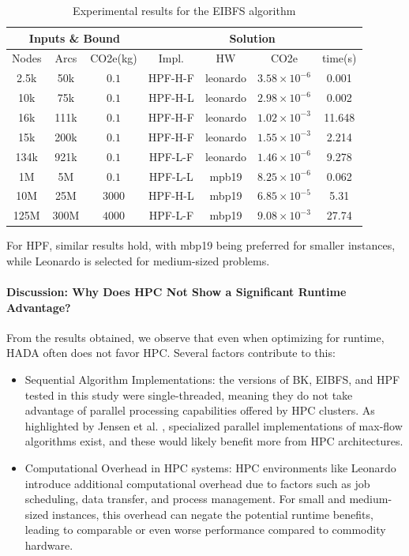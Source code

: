 \documentclass[a4paper,singleside,12pt]{report} %
\begin{document}
\begin{table}[h!]
    \centering
    \begin{tabular}{|ccc|cccc|}
        \hline
        \multicolumn{3}{|c|}{Inputs \& Bound} & \multicolumn{4}{c|}{Solution} \\
        \hline
        Nodes & Arcs & CO2e(kg) & Impl. & HW & CO2e & time(s) \\
        \hline
        2.5k & 50k & $0.1$ & HPF-H-F & leonardo & $3.58 \times 10^{-6}$ & 0.001 \\
        10k & 75k & $0.1$ & HPF-H-L & leonardo & $2.98 \times 10^{-6}$ & 0.002 \\
        16k & 111k & $0.1$ & HPF-H-F & leonardo & $1.02 \times 10^{-3}$ & 11.648 \\
        15k & 200k & $0.1$ & HPF-H-F & leonardo & $1.55 \times 10^{-3}$ & 2.214 \\
        134k & 921k & $0.1$ & HPF-L-F & leonardo & $1.46 \times 10^{-6}$ & 9.278 \\
        1M & 5M & $0.1$ & HPF-L-L & mpb19 & $8.25 \times 10^{-6}$ & 0.062 \\
        10M & 25M & $3000$ & HPF-H-L & mbp19 & $6.85 \times 10^{-5}$ & 5.31 \\
        125M & 300M & $4000$ & HPF-L-F & mbp19 & $9.08 \times 10^{-3}$ & 27.74 \\
        \hline
    \end{tabular}
    \caption{Experimental results for the EIBFS algorithm}
    \label{tab:hpf_results_runtime}
\end{table}

For HPF, similar results hold, with mbp19 being preferred for smaller instances, while Leonardo is selected for medium-sized problems.

\paragraph{Discussion: Why Does HPC Not Show a Significant Runtime Advantage?}

From the results obtained, we observe that even when optimizing for runtime, HADA often does not favor HPC. Several factors contribute to this:

\begin{itemize}
    \item Sequential Algorithm Implementations: the versions of BK, EIBFS, and HPF tested in this study were single-threaded, meaning they do not take advantage of parallel 
    processing capabilities offered by HPC clusters. As highlighted by Jensen et al. \cite{Jensen2023Maxflow}, specialized parallel implementations of max-flow algorithms exist, 
    and these would likely benefit more from HPC architectures.
    \item Computational Overhead in HPC systems: HPC environments like Leonardo introduce additional computational overhead due to factors such as job scheduling, data transfer, 
    and process management. For small and medium-sized instances, this overhead can negate the potential runtime benefits, leading to comparable or even worse performance compared 
    to commodity hardware.
\end{itemize}
\end{document}
